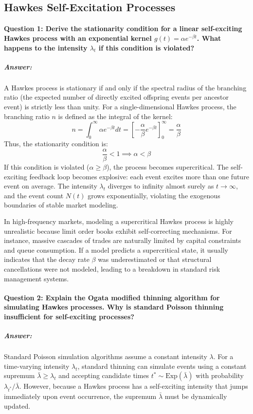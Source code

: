 \documentclass[11pt,a4paper]{article}
\begin{document}
\subsection{Hawkes Self-Excitation Processes}

\paragraph{Question 1: Derive the stationarity condition for a linear self-exciting Hawkes process with an exponential kernel $g(t) = \alpha e^{-\beta t}$. What happens to the intensity $\lambda_t$ if this condition is violated?}
\subparagraph{Answer:}
A Hawkes process is stationary if and only if the spectral radius of the branching ratio (the expected number of directly excited offspring events per ancestor event) is strictly less than unity. For a single-dimensional Hawkes process, the branching ratio $n$ is defined as the integral of the kernel:
\begin{equation}
    n = \int_{0}^{\infty} \alpha e^{-\beta t} dt = \left[ -\frac{\alpha}{\beta} e^{-\beta t} \right]_0^\infty = \frac{\alpha}{\beta}
\end{equation}
Thus, the stationarity condition is:
\begin{equation}
    \frac{\alpha}{\beta} < 1 \implies \alpha < \beta
\end{equation}
If this condition is violated ($\alpha \geq \beta$), the process becomes supercritical. The self-exciting feedback loop becomes explosive: each event excites more than one future event on average. The intensity $\lambda_t$ diverges to infinity almost surely as $t \to \infty$, and the event count $N(t)$ grows exponentially, violating the exogenous boundaries of stable market modeling.

In high-frequency markets, modeling a supercritical Hawkes process is highly unrealistic because limit order books exhibit self-correcting mechanisms. For instance, massive cascades of trades are naturally limited by capital constraints and queue consumption. If a model predicts a supercritical state, it usually indicates that the decay rate $\beta$ was underestimated or that structural cancellations were not modeled, leading to a breakdown in standard risk management systems.

\paragraph{Question 2: Explain the Ogata modified thinning algorithm for simulating Hawkes processes. Why is standard Poisson thinning insufficient for self-exciting processes?}
\subparagraph{Answer:}
Standard Poisson simulation algorithms assume a constant intensity $\lambda$. For a time-varying intensity $\lambda_t$, standard thinning can simulate events using a constant supremum $\bar{\lambda} \geq \lambda_t$ and accepting candidate times $t^* \sim \text{Exp}(\bar{\lambda})$ with probability $\lambda_{t^*}/\bar{\lambda}$. However, because a Hawkes process has a self-exciting intensity that jumps immediately upon event occurrence, the supremum $\bar{\lambda}$ must be dynamically updated.
\end{document}
